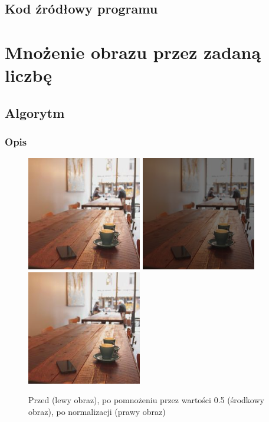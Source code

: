 \documentclass[a4paper,12pt]{book}
\begin{document}
\subsection*{Kod źródłowy programu}

\section{Mnożenie obrazu przez zadaną liczbę}
\subsection*{Algorytm}
\subsubsection*{Opis}
\begin{figure}[H]
	\caption{Przed (lewy obraz), po pomnożeniu przez wartości 0.5 (środkowy obraz), po normalizacji (prawy obraz)}
	\includegraphics[width=5cm, height=5cm]{coffee-unmodified.jpg}
	\includegraphics[width=5cm, height=5cm]{3-2/multiply-color-const-coffee-5.png}
	\includegraphics[width=5cm, height=5cm]{3-2/multiply-color-const-coffee-5-norm.png}
\end{figure}
\end{document}
